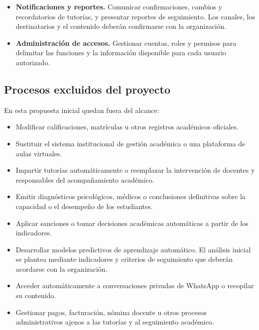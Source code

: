 \documentclass[11pt,a4paper]{article}
\begin{document}
\begin{itemize}
    \item \textbf{Notificaciones y reportes.}
    Comunicar confirmaciones, cambios y recordatorios
    de tutorías, y presentar reportes de seguimiento.
    Los canales, los destinatarios y el contenido
    deberán confirmarse con la organización.

    \item \textbf{Administración de accesos.}
    Gestionar cuentas, roles y permisos para delimitar
    las funciones y la información disponible
    para cada usuario autorizado.

\end{itemize}

\subsection{Procesos excluidos del proyecto}

En esta propuesta inicial quedan fuera del alcance:

\begin{itemize}

    \item Modificar calificaciones, matrículas u otros
    registros académicos oficiales.

    \item Sustituir el sistema institucional de gestión
    académica o una plataforma de aulas virtuales.

    \item Impartir tutorías automáticamente o reemplazar
    la intervención de docentes y responsables
    del acompañamiento académico.

    \item Emitir diagnósticos psicológicos, médicos
    o conclusiones definitivas sobre la capacidad
    o el desempeño de los estudiantes.

    \item Aplicar sanciones o tomar decisiones académicas
    automáticas a partir de los indicadores.

    \item Desarrollar modelos predictivos de aprendizaje
    automático. El análisis inicial se plantea mediante
    indicadores y criterios de seguimiento que deberán
    acordarse con la organización.

    \item Acceder automáticamente a conversaciones
    privadas de WhatsApp o recopilar su contenido.

    \item Gestionar pagos, facturación, nómina docente
    u otros procesos administrativos ajenos a las
    tutorías y al seguimiento académico.

\end{itemize}
\end{document}
